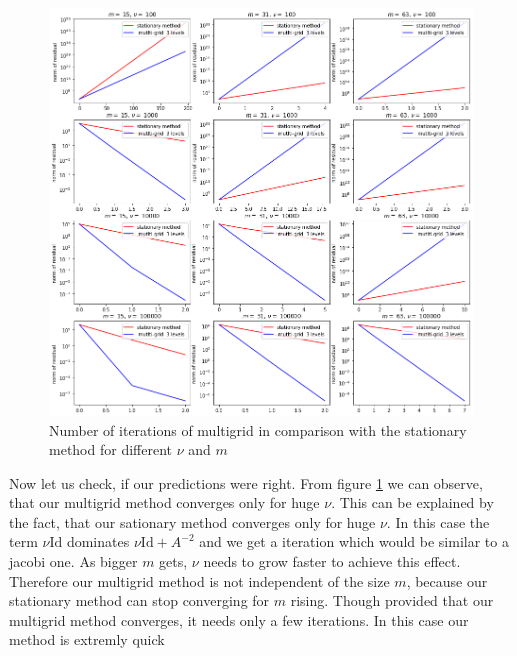 \documentclass{amsart}
\theoremstyle{definition}
\theoremstyle{remark}
\numberwithin{equation}{section}
\newcommand{\Id}{\mathrm{Id}}
\begin{document}
\begin{figure}[h!]
	\centering
	\includegraphics[scale=0.4]{./imgs/multigrid_stat_comparison_tiny}
	\caption{Number of iterations of multigrid in comparison with the stationary method for different $\nu$ and $m$}
	\label{fig: multigridStationary}
\end{figure}
Now let us check, if our predictions were right. From figure \ref{fig: multigridStationary} we can observe, that our multigrid method converges only for huge $\nu $. This can be explained by the fact, that our sationary method converges only for huge $\nu$. In this case the term $\nu \Id$ dominates $\nu \Id + A^{-2}$ and we get a iteration which would be similar to a jacobi one. As bigger $m$ gets, $\nu$ needs to grow faster to achieve this effect. Therefore our multigrid method is not independent of the size $m$, because our stationary method can stop converging for $m$ rising. Though provided that our multigrid method converges, it needs only a few iterations. In this case our method is extremly quick  


\end{document}
